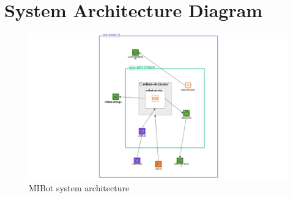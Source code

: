 \chapter{System Architecture Diagram}
\label{app:architecture-diagrams}

\begin{figure}[h!]
	\centering
	\includegraphics[width=0.99\linewidth]{fig/cloudcraft us-east-2.png}
	\caption{MIBot system architecture}
	\label{fig:mibot-sys-arch}
\end{figure}